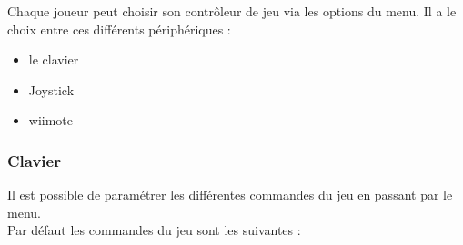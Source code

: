 Chaque joueur peut choisir son contrôleur de jeu via les options du menu. Il a le choix entre ces différents périphériques :\\

\begin{itemize}
	\item le clavier
	\item Joystick
	\item wiimote
\end{itemize}
	
	
\subsubsection{Clavier}
Il est possible de paramétrer les différentes commandes du jeu en passant par le menu.\\
Par défaut les commandes du jeu sont les suivantes :\\

